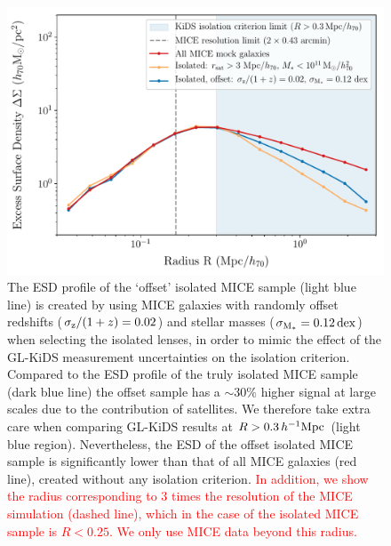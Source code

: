 \documentclass[usenatbib]{mnras}
\newcommand{\hMpc}{\, h^{-1}{\rm{Mpc}} }
\newcommand{\un}[1]{_{\rm #1}}
\newcommand{\dex}{\, {\rm dex}}
\begin{document}
\begin{figure}
	\includegraphics[width=1.0\columnwidth]{Figures/ESD_MICE_isotest_offset.pdf}
	\caption{The ESD profile of the `offset' isolated MICE sample (light blue line) is created by using MICE galaxies with randomly offset redshifts ($\sigma\un{z}/(1+z) = 0.02$) and stellar masses ($\sigma\un{M_*} = 0.12 \dex$) when selecting the isolated lenses, in order to mimic the effect of the GL-KiDS measurement uncertainties on the isolation criterion. Compared to the ESD profile of the truly isolated MICE sample (dark blue line) the offset sample has a $\sim30\%$ higher signal at large scales due to the contribution of satellites. We therefore take extra care when comparing GL-KiDS results at $R > 0.3 \hMpc$ (light blue region). Nevertheless, the ESD of the offset isolated MICE sample is significantly lower than that of all MICE galaxies (red line), created without any isolation criterion. \textcolor{red}{In addition, we show the radius corresponding to 3 times the resolution of the MICE simulation (dashed line), which in the case of the isolated MICE sample is $R<0.25$. We only use MICE data beyond this radius.}}
	\label{fig:isolation_test_offset}
\end{figure}
\end{document}
